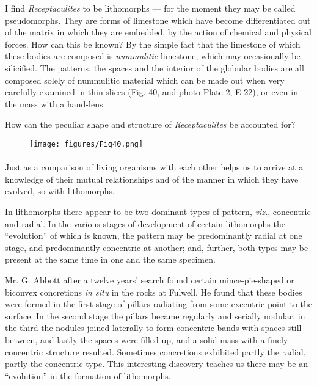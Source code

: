 \documentclass[a4paper, 12pt, oneside]{article}
\begin{document}
I find \emph{Receptaculites} to be lithomorphs --- for the moment they may be called pseudomorphs. They are forms of limestone which have become differentiated out of the matrix in which they are embedded, by the action of chemical and physical forces. How can this be known? By the simple fact that the limestone of which these bodies are composed is \emph{nummulitic} limestone, which may occasionally be silicified. The patterns, the spaces and the interior of the globular bodies are all composed solely of nummulitic material which can be made out when very carefully examined in thin slices (Fig. 40, and photo Plate 2, E 22), or even in the mass with a hand-lens.

How can the peculiar shape and structure of \emph{Receptaculites} be accounted for?
\begin{figure}[H]
\centering
\texttt{[image: figures/Fig40.png]}
\caption*{}
\end{figure}
\paragraph{}
Just as a comparison of living organisms with each other helps us to arrive at a knowledge of their mutual relationships and of the manner in which they have evolved, so with lithomorphs.

In lithomorphs there appear to be two dominant types of pattern, \emph{viz.}, concentric and radial. In the various stages of development of certain lithomorphs the ``evolution'' of which is known, the pattern may be predominantly radial at one stage, and predominantly concentric at another; and, further, both types may be present at the same time in one and the same specimen.

Mr. G. Abbott after a twelve years' search found certain mince-pie-shaped or biconvex concretions \emph{in situ} in the rocks at Fulwell. He found that these bodies were formed in the first stage of pillars radiating from some excentric point to the surface. In the second stage the pillars became regularly and serially nodular, in the third the nodules joined laterally to form concentric bands with spaces still between, and lastly the spaces were filled up, and a solid mass with a finely concentric structure resulted. Sometimes concretions exhibited partly the radial, partly the concentric type. This interesting discovery teaches us there may be an ``evolution'' in the formation of lithomorphs.
\end{document}
